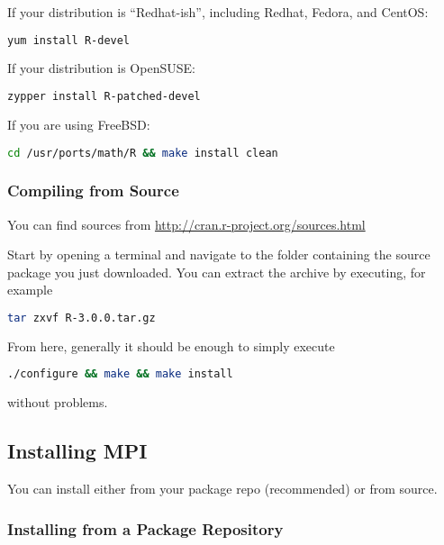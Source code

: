 \vspace{.4cm}
If your distribution is ``Redhat-ish'', including Redhat, Fedora, and CentOS:
\begin{lstlisting}[language=sh]
yum install R-devel
\end{lstlisting}

\vspace{.4cm}
If your distribution is OpenSUSE:
\begin{lstlisting}[language=sh]
zypper install R-patched-devel
\end{lstlisting}

\vspace{.4cm}
If you are using FreeBSD:
\begin{lstlisting}[language=sh]
cd /usr/ports/math/R && make install clean
\end{lstlisting}



\subsubsection{Compiling from Source}

You can find  sources from \url{http://cran.r-project.org/sources.html}

Start by opening a terminal and navigate to the folder containing the  source package you just downloaded.  You can extract the archive by executing, for example
\begin{lstlisting}[language=sh]
tar zxvf R-3.0.0.tar.gz
\end{lstlisting}

From here, generally it should be enough to simply execute
\begin{lstlisting}[language=sh]
./configure && make && make install
\end{lstlisting}
without problems.









\subsection{Installing MPI}

You can install  either from your package repo (recommended) or from source.

\subsubsection{Installing from a Package Repository}

